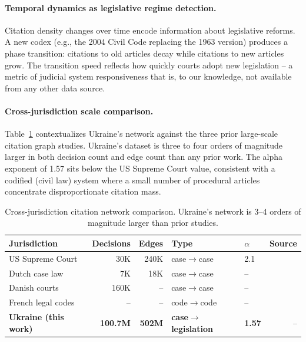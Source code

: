 \documentclass[11pt]{article}
\begin{document}
\paragraph{Temporal dynamics as legislative regime detection.}
Citation density changes over time encode information about legislative reforms.
A new codex (e.g., the 2004 Civil Code replacing the 1963 version) produces a phase transition: citations to old articles decay while citations to new articles grow.
The transition speed reflects how quickly courts adopt new legislation -- a metric of judicial system responsiveness that is, to our knowledge, not available from any other data source.

\paragraph{Cross-jurisdiction scale comparison.}
Table~\ref{tab:cross-jurisdiction} contextualizes Ukraine's network against the three prior large-scale citation graph studies.
Ukraine's dataset is three to four orders of magnitude larger in both decision count and edge count than any prior work.
The alpha exponent of 1.57 sits below the US Supreme Court value, consistent with a codified (civil law) system where a small number of procedural articles concentrate disproportionate citation mass.

\begin{table}[t]
\centering
\small
\caption{Cross-jurisdiction citation network comparison. Ukraine's network is 3--4 orders of magnitude larger than prior studies.}
\label{tab:cross-jurisdiction}
\begin{tabular}{@{}lrrllr@{}}
\toprule
\textbf{Jurisdiction} & \textbf{Decisions} & \textbf{Edges} & \textbf{Type} & \textbf{$\alpha$} & \textbf{Source} \\
\midrule
US Supreme Court & 30K & 240K & case$\to$case & 2.1 & \citet{fowler2007network} \\
Dutch case law & 7K & 18K & case$\to$case & -- & \citet{winkels2011determining} \\
Danish courts & 160K & -- & case$\to$case & -- & \citet{mones2021emergence} \\
French legal codes & -- & -- & code$\to$code & -- & \citet{mazzega2009network} \\
\textbf{Ukraine (this work)} & \textbf{100.7M} & \textbf{502M} & \textbf{case$\to$legislation} & \textbf{1.57} & -- \\
\bottomrule
\end{tabular}
\end{table}
\end{document}
